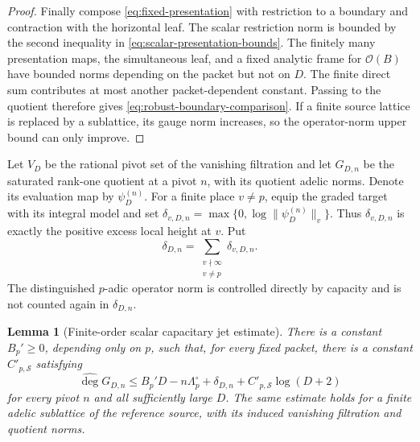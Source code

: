 \documentclass[11pt]{article}
\newtheorem{lemma}[lemma]{Lemma}
\theoremstyle{definition}
\theoremstyle{remark}
\newcommand{\calO}{\mathcal O}
\newcommand{\widehatdeg}{\widehat{\deg}}
\begin{document}
\begin{proof}
Finally compose \eqref{eq:fixed-presentation} with restriction to a boundary
and contraction with the horizontal leaf.  The scalar restriction norm is
bounded by the second inequality in
\eqref{eq:scalar-presentation-bounds}.  The finitely many presentation maps,
the simultaneous leaf, and a fixed analytic frame for $\calO(B)$ have bounded
norms depending on the packet but not on $D$.  The finite direct sum contributes
at most another packet-dependent constant.  Passing to the quotient therefore
gives \eqref{eq:robust-boundary-comparison}.  If a finite source lattice is
replaced by a sublattice, its gauge norm increases, so the operator-norm upper
bound can only improve.
\end{proof}

Let $V_D$ be the rational pivot set of the vanishing filtration and let
$G_{D,n}$ be the saturated rank-one quotient at a pivot $n$, with its quotient
adelic norms.  Denote its evaluation map by $\psi_D^{(n)}$.  For a finite
place $v\ne p$, equip the graded target with its integral model and set
$\delta_{v,D,n}=\max\{0,\log\|\psi_D^{(n)}\|_v\}$.  Thus
$\delta_{v,D,n}$ is exactly the positive excess local height at $v$.  Put
\[
 \delta_{D,n}=\sum_{\substack{v\nmid\infty\\v\ne p}}
                    \delta_{v,D,n}.
\]
The distinguished $p$-adic operator norm is controlled directly by capacity
and is not counted again in $\delta_{D,n}$.

\begin{lemma}[Finite-order scalar capacitary jet estimate]
\label{lem:robust-cap-jet}
There is a constant $B_p'\ge0$, depending only on $p$, such that, for every
fixed packet, there is a constant $C'_{p,\mathcal S}$ satisfying
\begin{equation}\label{eq:robust-single-jet}
 \widehatdeg G_{D,n}
 \le B_p'D-n\Lambda_p^\circ+\delta_{D,n}
     +C'_{p,\mathcal S}\log(D+2)
\end{equation}
for every pivot $n$ and all sufficiently large $D$.  The same estimate holds
for a finite adelic sublattice of the reference source, with its induced
vanishing filtration and quotient norms.
\end{lemma}
\end{document}
